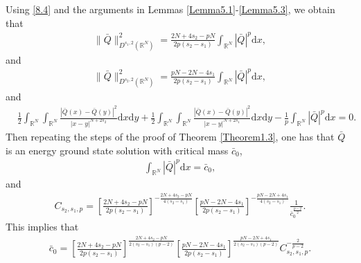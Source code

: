 \documentclass[12pt,a4paper,reqno]{amsart}
\numberwithin{equation}{section}
\begin{document}
Using \eqref{8.4} and the arguments in Lemmas \ref{Lemma5.1}-\ref{Lemma5.3}, we obtain that
\begin{equation*}
\begin{aligned}
\|\bar{Q}\|^{2}_{D^{s_{1},2}(\mathbb{R}^{N})}
=\frac{2N+4s_{2}-pN}{2p(s_{2}-s_{1})}
\int_{\mathbb{R}^{N}}|\bar{Q}|^{p}\mathrm{d}x,
\end{aligned}
\end{equation*}
and
\begin{equation*}
\begin{aligned}
\|\bar{Q}\|^{2}_{D^{s_{2},2}(\mathbb{R}^{N})}
=
\frac{pN-2N-4s_{1}}{2p(s_{2}-s_{1})}
\int_{\mathbb{R}^{N}}|\bar{Q}|^{p}\mathrm{d}x,
\end{aligned}
\end{equation*}
and
\begin{equation*}
\begin{aligned}
&
\frac{1}{2}
\int_{\mathbb{R}^{N}}
\int_{\mathbb{R}^{N}}
\frac{|\bar{Q}(x)-\bar{Q}(y)|^{2}}{|x-y|^{N+2s_{2}}}
\mathrm{d}x
\mathrm{d}y
+\frac{1}{2}
\int_{\mathbb{R}^{N}}
\int_{\mathbb{R}^{N}}
\frac{|\bar{Q}(x)-\bar{Q}(y)|^{2}}{|x-y|^{N+2s_{1}}}
\mathrm{d}x
\mathrm{d}y
-\frac{1}{p}
\int_{\mathbb{R}^{N}}
|\bar{Q}|^{p}
\mathrm{d}x=0.
\end{aligned}
\end{equation*}
Then repeating the steps of the proof of Theorem \ref{Theorem1.3},
one has that $\bar{Q}$ is an energy ground state solution with critical mass $\bar{c}_{0}$,
\begin{equation*}
\begin{aligned}
\int_{\mathbb{R}^{N}}
|\bar{Q}|^{p}
\mathrm{d}x
=\bar{c}_{0},
\end{aligned}
\end{equation*}
and
\begin{equation*}
\begin{aligned}
C_{s_{2},s_{1},p}
=
\left[
\frac{2N+4s_{2}-pN}{2p(s_{2}-s_{1})}
\right]^{-\frac{2N+4s_{2}-pN}{4(s_{2}-s_{1})}}
\left[
\frac{pN-2N-4s_{1}}{2p(s_{2}-s_{1})}
\right]^{-\frac{pN-2N+4s_{1}}{4(s_{2}-s_{1})}}
\frac{1}{\bar{c}_{0}^{\frac{p-2}{2}}}.
\end{aligned}
\end{equation*}
This implies that
\begin{equation*}
\begin{aligned}
\bar{c}_{0}
=
\left[
\frac{2N+4s_{2}-pN}{2p(s_{2}-s_{1})}
\right]^{\frac{2N+4s_{2}-pN}{2(s_{2}-s_{1})(p-2)}}
\left[
\frac{pN-2N-4s_{1}}{2p(s_{2}-s_{1})}
\right]^{\frac{pN-2N+4s_{1}}{2(s_{2}-s_{1})(p-2)}}
C_{s_{2},s_{1},p}^{-\frac{2}{p-2}}.
\end{aligned}
\end{equation*}
\end{document}
